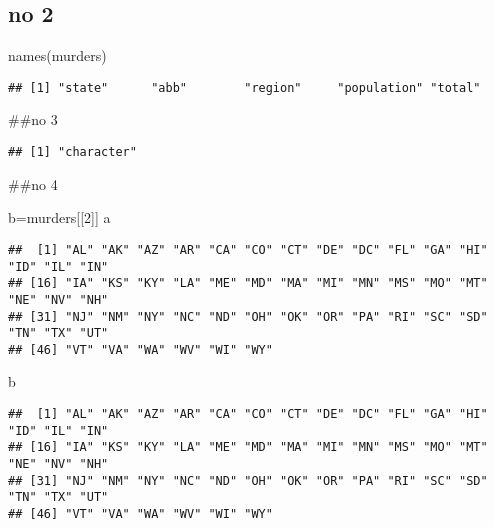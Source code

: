 \documentclass[
]{article}
\newenvironment{Shaded}{\begin{snugshade}}{\end{snugshade}}
\newcommand{\DecValTok}[1]{\textcolor[rgb]{0.00,0.00,0.81}{#1}}
\newcommand{\FunctionTok}[1]{\textcolor[rgb]{0.00,0.00,0.00}{#1}}
\newcommand{\NormalTok}[1]{#1}
\newcommand{\OtherTok}[1]{\textcolor[rgb]{0.56,0.35,0.01}{#1}}
\newcommand{\SpecialCharTok}[1]{\textcolor[rgb]{0.00,0.00,0.00}{#1}}
\begin{document}
\hypertarget{no-2}{%
\subsection{no 2}\label{no-2}}

\begin{Shaded}
\begin{Highlighting}[]
\FunctionTok{names}\NormalTok{(murders)}
\end{Highlighting}
\end{Shaded}

\begin{verbatim}
## [1] "state"      "abb"        "region"     "population" "total"
\end{verbatim}

\#\#no 3

\begin{Shaded}
\end{Shaded}

\begin{verbatim}
## [1] "character"
\end{verbatim}

\#\#no 4

\begin{Shaded}
\begin{Highlighting}[]
\NormalTok{b}\OtherTok{=}\NormalTok{murders[[}\DecValTok{2}\NormalTok{]]}
\NormalTok{a}
\end{Highlighting}
\end{Shaded}

\begin{verbatim}
##  [1] "AL" "AK" "AZ" "AR" "CA" "CO" "CT" "DE" "DC" "FL" "GA" "HI" "ID" "IL" "IN"
## [16] "IA" "KS" "KY" "LA" "ME" "MD" "MA" "MI" "MN" "MS" "MO" "MT" "NE" "NV" "NH"
## [31] "NJ" "NM" "NY" "NC" "ND" "OH" "OK" "OR" "PA" "RI" "SC" "SD" "TN" "TX" "UT"
## [46] "VT" "VA" "WA" "WV" "WI" "WY"
\end{verbatim}

\begin{Shaded}
\begin{Highlighting}[]
\NormalTok{b}
\end{Highlighting}
\end{Shaded}

\begin{verbatim}
##  [1] "AL" "AK" "AZ" "AR" "CA" "CO" "CT" "DE" "DC" "FL" "GA" "HI" "ID" "IL" "IN"
## [16] "IA" "KS" "KY" "LA" "ME" "MD" "MA" "MI" "MN" "MS" "MO" "MT" "NE" "NV" "NH"
## [31] "NJ" "NM" "NY" "NC" "ND" "OH" "OK" "OR" "PA" "RI" "SC" "SD" "TN" "TX" "UT"
## [46] "VT" "VA" "WA" "WV" "WI" "WY"
\end{verbatim}
\end{document}
